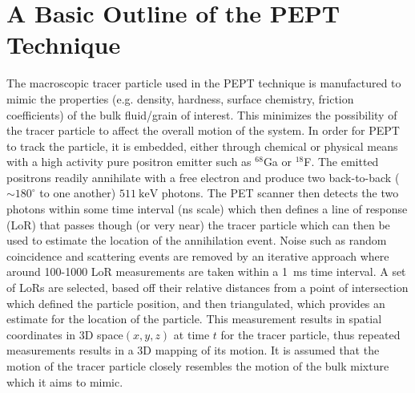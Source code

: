 \documentclass[]{article}
\begin{document}
\section{A Basic Outline of the PEPT Technique}\label{peptOutline}
The macroscopic tracer particle used in the PEPT technique is manufactured to mimic the properties (e.g. density, hardness, surface chemistry, friction coefficients) of the bulk fluid/grain of interest. This minimizes the possibility of the tracer particle to affect the overall motion of the system. In order for PEPT to track the particle, it is embedded, either through chemical or physical means with a high activity pure positron emitter such as ${}^{68}$Ga or ${}^{18}$F. The emitted positrons readily annihilate with a free electron and produce two back-to-back ($\sim 180^\circ$ to one another) $\SI{511}{\kilo \electronvolt}$ photons. The PET scanner then detects the two photons within some time interval (ns scale) which then defines a line of response (LoR) that passes though (or very near) the tracer particle which can then be used to estimate the location of the annihilation event. Noise such as random coincidence and scattering events are removed by an iterative approach where around 100-1000 LoR measurements are taken within a \SI{1}{\milli \second} time interval. A set of LoRs are selected, based off their relative distances from a point of intersection which defined the particle position, and then triangulated, which provides an estimate for the location of the particle. This measurement results in spatial coordinates in 3D space$(x,y,z)$ at time $t$ for the tracer particle, thus repeated measurements results in a 3D mapping of its motion. It is assumed that the motion of the tracer particle closely resembles the motion of the bulk mixture which it aims to mimic.\\\\
\end{document}
